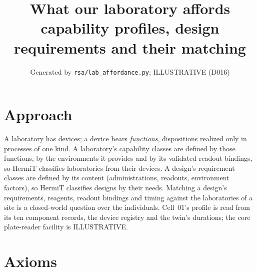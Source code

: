 \documentclass[10pt,a4paper]{article}
\title{What our laboratory affords\\[2pt]\large capability profiles, design requirements and their matching}
\author{Generated by \texttt{rsa/lab\_affordance.py}; ILLUSTRATIVE (D016)}\date{}
\begin{document}
\maketitle
\section*{Approach}
A laboratory has devices; a device bears \emph{functions}, dispositions realized only in processes of one kind. A
laboratory's capability classes are defined by those functions, by the environments it provides and by its validated
readout bindings, so HermiT classifies laboratories from their devices. A design's requirement classes are defined by
its content (administrations, readouts, environment factors), so HermiT classifies designs by their needs. Matching a
design's requirements, reagents, readout bindings and timing against the laboratories of a site is a closed-world
question over the individuals. Cell~01's profile is read from its ten component records, the device registry and the
twin's durations; the core plate-reader facility is ILLUSTRATIVE.
\section*{Axioms}
\end{document}
